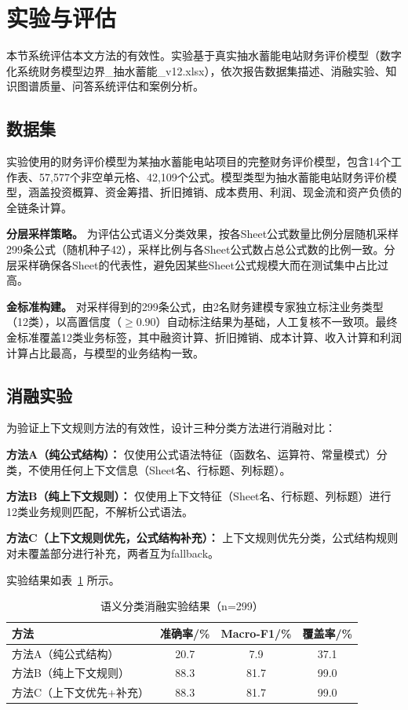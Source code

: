 \section{\heiti 实验与评估}

本节系统评估本文方法的有效性。实验基于真实抽水蓄能电站财务评价模型（数字化系统财务模型边界\_抽水蓄能\_v12.xlsx），依次报告数据集描述、消融实验、知识图谱质量、问答系统评估和案例分析。

\subsection{\heiti 数据集}

实验使用的财务评价模型为某抽水蓄能电站项目的完整财务评价模型，包含14个工作表、57,577个非空单元格、42,109个公式。模型类型为抽水蓄能电站财务评价模型，涵盖投资概算、资金筹措、折旧摊销、成本费用、利润、现金流和资产负债的全链条计算。

\textbf{分层采样策略。} 为评估公式语义分类效果，按各Sheet公式数量比例分层随机采样299条公式（随机种子42），采样比例与各Sheet公式数占总公式数的比例一致。分层采样确保各Sheet的代表性，避免因某些Sheet公式规模大而在测试集中占比过高。

\textbf{金标准构建。} 对采样得到的299条公式，由2名财务建模专家独立标注业务类型（12类），以高置信度（$\geq 0.90$）自动标注结果为基础，人工复核不一致项。最终金标准覆盖12类业务标签，其中融资计算、折旧摊销、成本计算、收入计算和利润计算占比最高，与模型的业务结构一致。

\subsection{\heiti 消融实验}

为验证上下文规则方法的有效性，设计三种分类方法进行消融对比：

\textbf{方法A（纯公式结构）：} 仅使用公式语法特征（函数名、运算符、常量模式）分类，不使用任何上下文信息（Sheet名、行标题、列标题）。

\textbf{方法B（纯上下文规则）：} 仅使用上下文特征（Sheet名、行标题、列标题）进行12类业务规则匹配，不解析公式语法。

\textbf{方法C（上下文规则优先，公式结构补充）：} 上下文规则优先分类，公式结构规则对未覆盖部分进行补充，两者互为fallback。

实验结果如表~\ref{tab:ablation} 所示。

\begin{table}[H]
	\centering
	\caption{语义分类消融实验结果（n=299）}
	\label{tab:ablation}
	\vspace {-2.5mm}
	\begin{center}
		\begin{tabular}{lccc}
			\toprule
			方法 & 准确率/\% & Macro-F1/\% & 覆盖率/\% \\
			\hline
			方法A（纯公式结构） & 20.7 & 7.9 & 37.1 \\
			方法B（纯上下文规则） & 88.3 & 81.7 & 99.0 \\
			方法C（上下文优先+补充） & 88.3 & 81.7 & 99.0 \\
			\bottomrule
		\end{tabular}
	\end{center}
\end{table}

